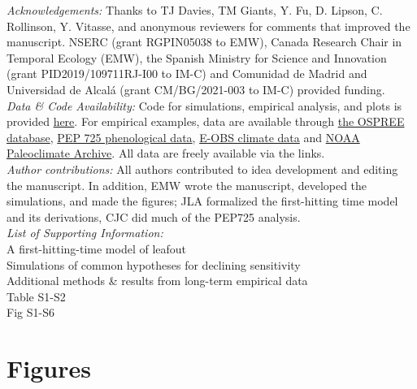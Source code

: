 \documentclass[11pt,letter]{article}
\begin{document}
\emph{Acknowledgements:} Thanks to TJ Davies, TM Giants, Y. Fu, D. Lipson, C. Rollinson, Y. Vitasse, and anonymous reviewers for comments that improved the manuscript.  NSERC (grant RGPIN­05038 to EMW), Canada Research Chair in Temporal Ecology (EMW), the Spanish Ministry for Science and Innovation (grant PID2019/109711RJ-I00 to IM-C) and Comunidad de Madrid and Universidad de Alcal\'a (grant CM/BG/2021-003 to IM-C) provided funding. 
\\ %

\emph{Data \& Code Availability:} Code for simulations, empirical analysis, and plots is provided \href{https://github.com/temporalecologylab/labgit/tree/master/projects/decsenspost}{here}. For empirical examples, data are available through \href{https://knb.ecoinformatics.org}{the OSPREE database}, \href{http://www.pep725.eu/data.php}{PEP 725 phenological data}, \href{https://surfobs.climate.copernicus.eu/dataaccess/access_eobs.php}{E-OBS climate data} and \href{https://www.ncdc.noaa.gov/data-access/paleoclimatology-data/datasets}{NOAA Paleoclimate Archive}. All data are freely available via the links.\\

\emph{Author contributions:} All authors contributed to idea development and editing the manuscript. In addition, EMW wrote the manuscript, developed the simulations, and made the figures; JLA formalized the first-hitting time model and its derivations, CJC did much of the PEP725 analysis.\\

\emph{List of Supporting Information:}\\
A first-hitting-time model of leafout\\
Simulations of common hypotheses for declining sensitivity\\
Additional methods \& results from long-term empirical data\\
Table S1-S2\\
Fig S1-S6

\newpage
\section* {Figures}
\end{document}
